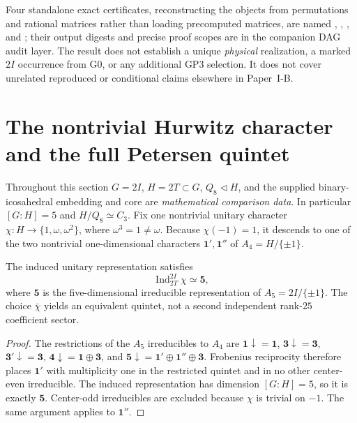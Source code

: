\documentclass[11pt]{article}
\begin{document}
Four standalone exact certificates, reconstructing the objects from
permutations and rational matrices rather than loading precomputed
matrices, are named
,
,
, and
; their output digests
and precise proof scopes are in the companion DAG audit layer.
The result does not establish a unique \emph{physical} realization,
a marked \(2I\) occurrence from G0, or any additional GP3
selection.  It does not cover unrelated reproduced or conditional
claims elsewhere in Paper~I-B.



\section{The nontrivial Hurwitz character and the full Petersen quintet}
\label{p1:sec:v344-twisted-hurwitz-petersen}
Throughout this section $G=2I$, $H=2T\subset G$, $Q_8\triangleleft H$,
and the supplied binary-icosahedral embedding and core are \emph{mathematical
comparison data}.  In particular $[G:H]=5$ and $H/Q_8\simeq C_3$.
Fix one nontrivial unitary character
$\chi:H\to\{1,\omega,\omega^2\}$, where $\omega^3=1\ne\omega$.
Because $\chi(-1)=1$, it descends to one of the two nontrivial
one-dimensional characters $\mathbf1',\mathbf1''$ of $A_4=H/\{\pm1\}$.

\begin{theorem}
\label{p1:thm:v344-induced-hurwitz-quintet}
The induced unitary representation satisfies
\[
 \boxed{\operatorname{Ind}_{2T}^{2I}\chi\simeq\mathbf5},
\]
where $\mathbf5$ is the five-dimensional irreducible representation
of $A_5=2I/\{\pm1\}$.  The choice $\bar\chi$ yields an equivalent
quintet, not a second independent rank-$25$ coefficient sector.
\end{theorem}
\begin{proof}
The restrictions of the $A_5$ irreducibles to $A_4$ are
$\mathbf1\downarrow=\mathbf1$,
$\mathbf3\downarrow=\mathbf3$,
$\mathbf3'\downarrow=\mathbf3$,
$\mathbf4\downarrow=\mathbf1\oplus\mathbf3$, and
$\mathbf5\downarrow=\mathbf1'\oplus\mathbf1''\oplus\mathbf3$.
Frobenius reciprocity therefore places $\mathbf1'$ with multiplicity
one in the restricted quintet and in no other center-even irreducible.
The induced representation has dimension $[G:H]=5$, so it is exactly
$\mathbf5$.  Center-odd irreducibles are excluded because $\chi$ is
trivial on $-1$.  The same argument applies to $\mathbf1''$.
\end{proof}
\end{document}
